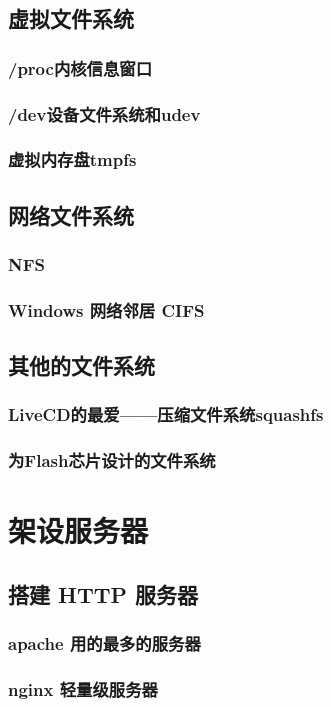 \documentclass[amstex]{ctexbook}
\begin{document}
\section{  虚拟文件系统	}
\subsection{  /proc内核信息窗口}
\subsection{  /dev设备文件系统和udev}
\subsection{  虚拟内存盘tmpfs}
\section{  网络文件系统	}
\subsection{  NFS	}
\subsection{  Windows 网络邻居 CIFS	}
\section{  其他的文件系统	}
\subsection{  LiveCD的最爱——压缩文件系统squashfs}
\subsection{  为Flash芯片设计的文件系统}

\chapter{架设服务器}
\section{  搭建 HTTP 服务器}
\subsection{  apache 用的最多的服务器}
\subsection{ nginx 轻量级服务器}
\end{document}
